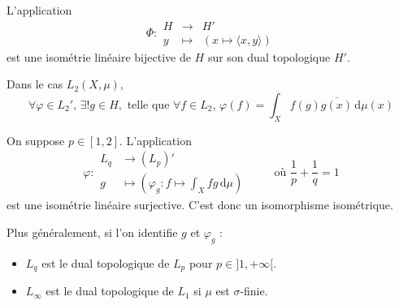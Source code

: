 
  \begin{theorem}
    L'application
    \[
    \Phi :
    \begin{array}{ccc}
      H &\rightarrow& H' \\
      y &\mapsto& (x \mapsto \langle x, y \rangle)
    \end{array}
    \]
    est une isométrie linéaire bijective de $H$ sur son dual topologique $H'$.
  \end{theorem}

  \begin{example}
    Dans le cas $L_2(X, \mu)$,
    \[ \forall \varphi \in L_2', \, \exists! g \in H, \text{ telle que } \forall f \in L_2, \, \varphi(f) = \int_X f(g) \overline{g(x)} \, \mathrm{d}\mu(x) \]
  \end{example}


  \begin{theorem}
    On suppose $p \in [1, 2]$. L'application
    \[
    \varphi :
    \begin{array}{ll}
      L_q &\rightarrow (L_p)' \\
      g &\mapsto \left( \varphi_g : f \mapsto \int_X f g \, \mathrm{d}\mu \right)
    \end{array}
    \qquad \text{ où } \frac{1}{p} + \frac{1}{q} = 1
    \]
    est une isométrie linéaire surjective. C'est donc un isomorphisme isométrique.
  \end{theorem}


  \begin{remark}
    Plus généralement, si l'on identifie $g$ et $\varphi_g$ :
    \begin{itemize}
      \item $L_q$ est le dual topologique de $L_p$ pour $p \in ]1, +\infty[$.
      \item $L_\infty$ est le dual topologique de $L_1$ si $\mu$ est $\sigma$-finie.
    \end{itemize}
  \end{remark}

